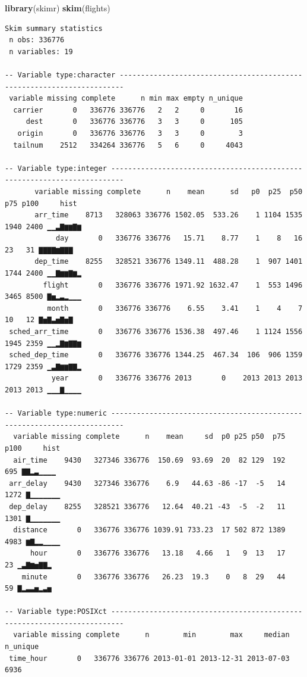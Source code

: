 \documentclass[a4paperpaper,]{article}
\newenvironment{Shaded}{\begin{snugshade}}{\end{snugshade}}
\newcommand{\KeywordTok}[1]{\textcolor[rgb]{0.12,0.11,0.11}{\textbf{#1}}}
\newcommand{\NormalTok}[1]{\textcolor[rgb]{0.12,0.11,0.11}{#1}}
\begin{document}
\begin{Shaded}
\begin{Highlighting}[]
\KeywordTok{library}\NormalTok{(skimr)}
\KeywordTok{skim}\NormalTok{(flights)}
\end{Highlighting}
\end{Shaded}

\begin{verbatim}
Skim summary statistics
 n obs: 336776 
 n variables: 19 

-- Variable type:character -----------------------------------------------------------------------
 variable missing complete      n min max empty n_unique
  carrier       0   336776 336776   2   2     0       16
     dest       0   336776 336776   3   3     0      105
   origin       0   336776 336776   3   3     0        3
  tailnum    2512   334264 336776   5   6     0     4043

-- Variable type:integer -------------------------------------------------------------------------
       variable missing complete      n    mean      sd   p0  p25  p50  p75 p100     hist
       arr_time    8713   328063 336776 1502.05  533.26    1 1104 1535 1940 2400 ▁▁▃▇▆▆▇▆
            day       0   336776 336776   15.71    8.77    1    8   16   23   31 ▇▇▇▇▆▇▇▇
       dep_time    8255   328521 336776 1349.11  488.28    1  907 1401 1744 2400 ▁▁▇▆▆▇▆▂
         flight       0   336776 336776 1971.92 1632.47    1  553 1496 3465 8500 ▇▅▂▃▂▁▁▁
          month       0   336776 336776    6.55    3.41    1    4    7   10   12 ▇▅▇▃▅▇▅▇
 sched_arr_time       0   336776 336776 1536.38  497.46    1 1124 1556 1945 2359 ▁▁▂▇▆▇▇▆
 sched_dep_time       0   336776 336776 1344.25  467.34  106  906 1359 1729 2359 ▁▃▇▆▆▇▇▂
           year       0   336776 336776 2013       0    2013 2013 2013 2013 2013 ▁▁▁▇▁▁▁▁

-- Variable type:numeric -------------------------------------------------------------------------
  variable missing complete      n    mean     sd  p0 p25 p50  p75 p100     hist
  air_time    9430   327346 336776  150.69  93.69  20  82 129  192  695 ▇▇▂▃▁▁▁▁
 arr_delay    9430   327346 336776    6.9   44.63 -86 -17  -5   14 1272 ▇▁▁▁▁▁▁▁
 dep_delay    8255   328521 336776   12.64  40.21 -43  -5  -2   11 1301 ▇▁▁▁▁▁▁▁
  distance       0   336776 336776 1039.91 733.23  17 502 872 1389 4983 ▆▇▂▂▁▁▁▁
      hour       0   336776 336776   13.18   4.66   1   9  13   17   23 ▁▃▇▆▅▇▇▂
    minute       0   336776 336776   26.23  19.3    0   8  29   44   59 ▇▂▃▃▅▂▃▅

-- Variable type:POSIXct -------------------------------------------------------------------------
  variable missing complete      n        min        max     median n_unique
 time_hour       0   336776 336776 2013-01-01 2013-12-31 2013-07-03     6936
\end{verbatim}
\end{document}
